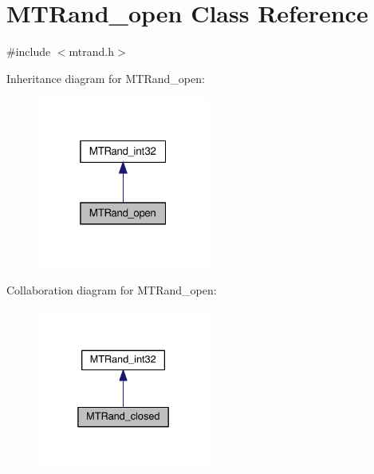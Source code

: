 \hypertarget{a00014}{\section{M\-T\-Rand\-\_\-open Class Reference}
\label{a00014}
}


{\ttfamily \#include $<$mtrand.\-h$>$}



Inheritance diagram for M\-T\-Rand\-\_\-open\-:\nopagebreak
\begin{figure}[H]
\begin{center}
\leavevmode
\includegraphics[width=160pt]{a00156}
\end{center}
\end{figure}


Collaboration diagram for M\-T\-Rand\-\_\-open\-:\nopagebreak
\begin{figure}[H]
\begin{center}
\leavevmode
\includegraphics[width=160pt]{a00157}
\end{center}
\end{figure}
